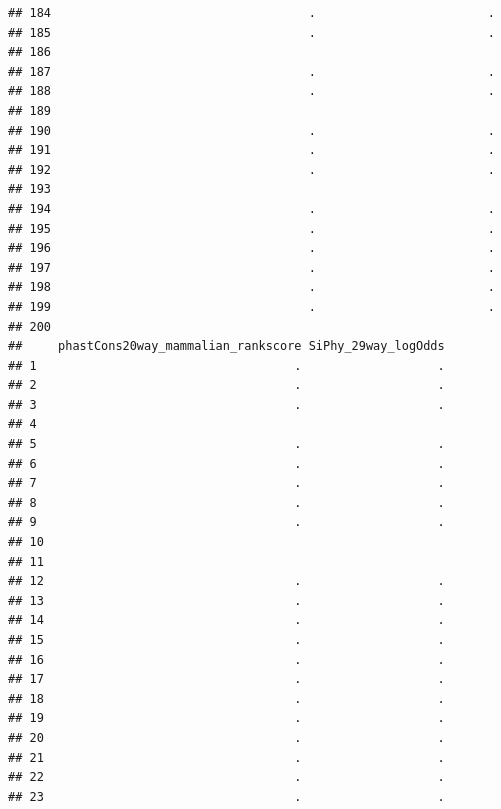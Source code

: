\documentclass[
]{article}
\begin{document}
\begin{verbatim}
## 184                                    .                        .
## 185                                    .                        .
## 186                                                              
## 187                                    .                        .
## 188                                    .                        .
## 189                                                              
## 190                                    .                        .
## 191                                    .                        .
## 192                                    .                        .
## 193                                                              
## 194                                    .                        .
## 195                                    .                        .
## 196                                    .                        .
## 197                                    .                        .
## 198                                    .                        .
## 199                                    .                        .
## 200                                                              
##     phastCons20way_mammalian_rankscore SiPhy_29way_logOdds
## 1                                    .                   .
## 2                                    .                   .
## 3                                    .                   .
## 4                                                         
## 5                                    .                   .
## 6                                    .                   .
## 7                                    .                   .
## 8                                    .                   .
## 9                                    .                   .
## 10                                                        
## 11                                                        
## 12                                   .                   .
## 13                                   .                   .
## 14                                   .                   .
## 15                                   .                   .
## 16                                   .                   .
## 17                                   .                   .
## 18                                   .                   .
## 19                                   .                   .
## 20                                   .                   .
## 21                                   .                   .
## 22                                   .                   .
## 23                                   .                   .

\end{verbatim}
\end{document}
